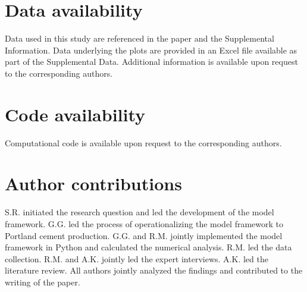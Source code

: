 \documentclass[12pt, a4paper]{article} %
\newcommand{\Suppl}{Supplemental}
\begin{document}
\section*{Data availability}
Data used in this study are referenced in the paper and the \Suppl$ $ Information. Data underlying the plots are provided in an Excel file available as part of the \Suppl$ $ Data. Additional information is available upon request to the corresponding authors.

\section*{Code availability}
Computational code is available upon request to the corresponding authors.

% 

{\small }

\section*{Author contributions}
S.R. initiated the research question and led the development of the model framework. G.G. led the process of operationalizing the model framework to Portland cement production. G.G. and R.M. jointly implemented the model framework in Python and calculated the numerical analysis. R.M. led the data collection. R.M. and A.K. jointly led the expert interviews. A.K. led the literature review. All authors jointly analyzed the findings and contributed to the writing of the paper.

\end{document}
